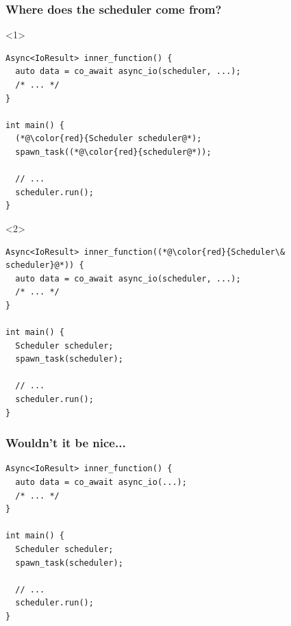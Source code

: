 \documentclass[aspectratio=169]{beamer}
\begin{document}
\begin{frame}[fragile]
  \frametitle{Where does the scheduler come from?}

  \begin{onlyenv}<1>
  \begin{lstlisting}[style=cpp20]
Async<IoResult> inner_function() {
  auto data = co_await async_io(scheduler, ...);
  /* ... */
}

int main() {
  (*@\color{red}{Scheduler scheduler@*);
  spawn_task((*@\color{red}{scheduler@*));
  
  // ...
  scheduler.run();
}
  \end{lstlisting}
  \end{onlyenv}
  \begin{onlyenv}<2>
  \begin{lstlisting}[style=cpp20]
Async<IoResult> inner_function((*@\color{red}{Scheduler\& scheduler}@*)) {
  auto data = co_await async_io(scheduler, ...);
  /* ... */
}

int main() {
  Scheduler scheduler;
  spawn_task(scheduler);

  // ...
  scheduler.run();
}
  \end{lstlisting}
  \end{onlyenv}
  
  
\end{frame}

\begin{frame}[fragile]
  \frametitle{Wouldn't it be nice...}
  
  \begin{lstlisting}[style=cpp20]
Async<IoResult> inner_function() {
  auto data = co_await async_io(...);
  /* ... */
}

int main() {
  Scheduler scheduler;
  spawn_task(scheduler);

  // ...
  scheduler.run();
}
  \end{lstlisting}
\end{frame}
\end{document}
